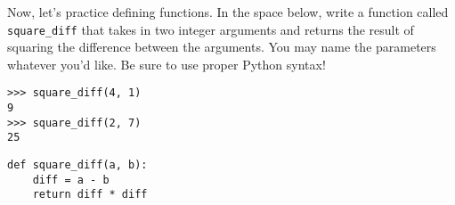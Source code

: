 \question Now, let's practice defining functions. In the space below, write a
function called \texttt{square\_diff} that takes in two integer arguments and
returns the result of squaring the difference between the arguments. You may
name the parameters whatever you'd like. Be sure to use proper Python syntax!

\begin{lstlisting}
>>> square_diff(4, 1)
9
>>> square_diff(2, 7)
25
\end{lstlisting}

\begin{solution}[1in]
\begin{lstlisting}
def square_diff(a, b):
    diff = a - b
    return diff * diff
\end{lstlisting}
\end{solution}
